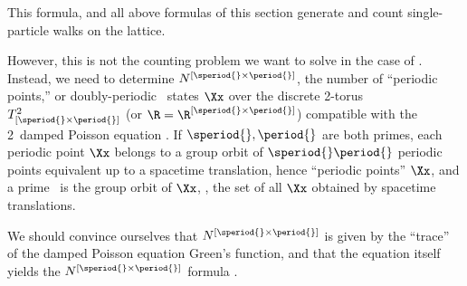 This formula, and all above formulas of this section generate and count
single-particle walks on the lattice.

However, this is not the counting problem we want to solve
in the case of \catlatt.
Instead, we need to determine $N^{[\speriod{}\times\period{}]}$, the
number of ``periodic points,'' or doubly-periodic \twot\ states $\Xx$
over the discrete 2-torus $T^2_{[\speriod{}\times\period{}]}$ (or $\R =
\R^{[\speriod{}\times\period{}]}$) compatible with the 2\dmn\  damped
Poisson equation . If $\speriod{},\period{}$ are both
primes, each periodic point $\Xx$ belongs to a group orbit of
$\speriod{}\period{}$ periodic points equivalent up to a spacetime
translation, hence ``periodic points'' $\Xx$, and a prime \po\ is the
group orbit of $\Xx$, \ie, the set of all $\Xx$ obtained by spacetime
translations.

We should convince ourselves that $N^{[\speriod{}\times\period{}]}$ is
given by the ``trace'' of the damped Poisson equation Green's function,
and that the equation itself yields the $N^{[\speriod{}\times\period{}]}$
formula .
